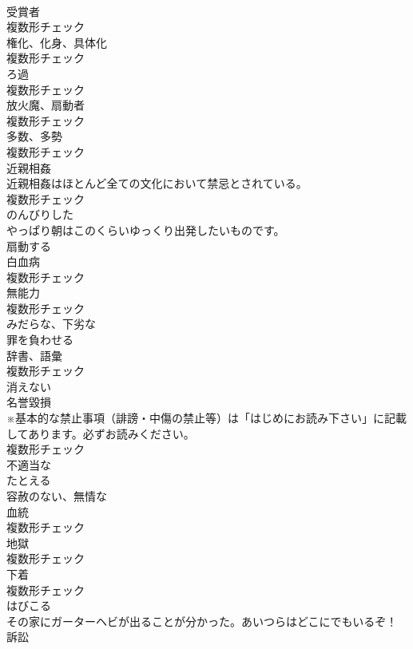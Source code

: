 \documentclass[8pt]{extreport}
\begin{document}
\begin{CJK}{UTF8}{min}
\\	[名詞]	受賞者	
\\	複数形チェック
\\	[名詞]	権化、化身、具体化	
\\	複数形チェック
\\	[名詞]	ろ過	
\\	複数形チェック
\\	[名詞]	放火魔、扇動者	
\\	複数形チェック
\\	[名詞]	多数、多勢	
\\	複数形チェック
\\	[名詞]	近親相姦	
\\	近親相姦はほとんど全ての文化において禁忌とされている。	
\\	複数形チェック
\\	[形容詞]	のんびりした	
\\	やっぱり朝はこのくらいゆっくり出発したいものです。	
\\	[動詞]	扇動する	
\\	[名詞]	白血病	
\\	複数形チェック
\\	[名詞]	無能力	
\\	複数形チェック
\\	[形容詞]	みだらな、下劣な	
\\	[動詞]	罪を負わせる	
\\	[名詞]	辞書、語彙	
\\	複数形チェック
\\	[形容詞]	消えない	
\\	[名詞]	名誉毀損	
\\	※基本的な禁止事項（誹謗・中傷の禁止等）は「はじめにお読み下さい」に記載してあります。必ずお読みください。	
\\	複数形チェック
\\	[形容詞]	不適当な	
\\	[動詞]	たとえる	
\\	[形容詞]	容赦のない、無情な	
\\	[名詞]	血統	
\\	複数形チェック
\\	[名詞]	地獄	
\\	複数形チェック
\\	[名詞]	下着	
\\	複数形チェック
\\	[動詞]	はびこる	
\\	その家にガーターヘビが出ることが分かった。あいつらはどこにでもいるぞ！	
\\	[名詞]	訴訟	

\end{CJK}
\end{document}
